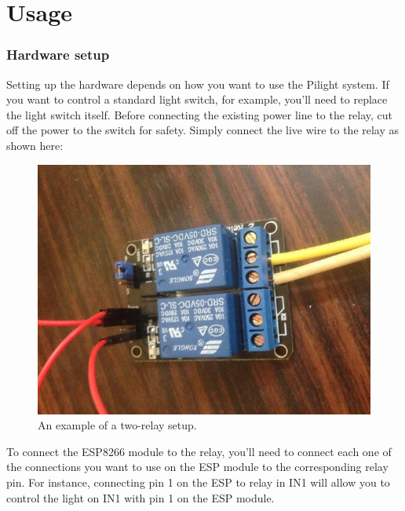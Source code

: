 \section{Usage}
\subsubsection{Hardware setup}
Setting up the hardware depends on how you want to use the Pilight system. If you want to control a standard light switch, for example, you'll need to replace the light switch itself. Before connecting the existing power line to the relay, cut off the power to the switch for safety. Simply connect the live wire to the relay as shown here:\\
\begin{figure}[h!]
   \includegraphics[scale=0.5]{relay}
   \caption{An example of a two-relay setup.}
\end{figure}
To connect the ESP8266 module to the relay, you'll need to connect each one of the connections you want to use on the ESP module to the corresponding relay pin. For instance, connecting pin 1 on the ESP to relay in IN1 will allow you to control the light on IN1 with pin 1 on the ESP module.\\

